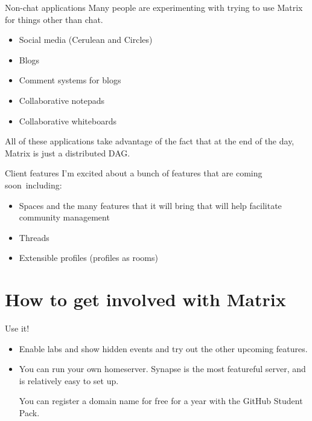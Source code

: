 \documentclass{acm}
\begin{document}
\begin{frame}{Non-chat applications}
    Many people are experimenting with trying to use Matrix for things other
    than chat.

    \begin{itemize}
        \item Social media (Cerulean and Circles)
        \item Blogs
        \item Comment systems for blogs
        \item Collaborative notepads
        \item Collaborative whiteboards
    \end{itemize}

    All of these applications take advantage of the fact that at the end of the
    day, Matrix is just a distributed DAG.
\end{frame}

\begin{frame}{Client features}
    I'm excited about a bunch of features that are coming soon\texttrademark\ 
    including:

    \begin{itemize}
        \item Spaces and the many features that it will bring that will help
            facilitate community management
        \item Threads
        \item Extensible profiles (profiles as rooms)
    \end{itemize}
\end{frame}

\section{How to get involved with Matrix}

\begin{frame}{Use it!}
    \begin{itemize}[<+->]
        \item Enable labs and show hidden events and try out the other upcoming
            features.

        \item You can run your own homeserver. Synapse is the most featureful
            server, and is relatively easy to set up.

            You can register a domain name for free for a year with the GitHub
            Student Pack.
    \end{itemize}
\end{frame}
\end{document}
